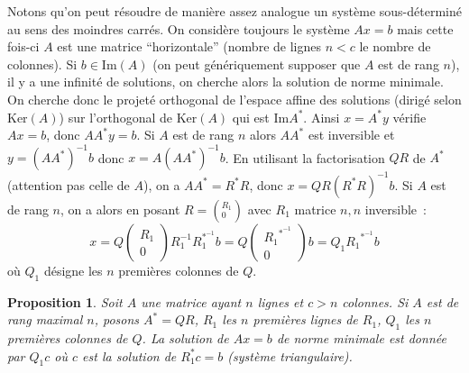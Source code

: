 \documentclass[a4paper,11pt]{article}
\newtheorem{prop}[thm]{Proposition}
\begin{document}
\begin{giacjshere}
Notons qu'on peut r\'esoudre de mani\`ere assez analogue
un syst\`eme sous-d\'etermin\'e au sens des moindres carr\'es.
On consid\`ere toujours le syst\`eme $Ax=b$ mais cette fois-ci
$A$ est une matrice ``horizontale'' (nombre de lignes $n<c$ le nombre
de colonnes). Si $b \in $Im$(A)$ (on peut g\'en\'eriquement supposer
que $A$ est de rang $n$), 
il y a une infinit\'e de solutions, on
cherche alors la solution de norme minimale. On cherche donc le
projet\'e orthogonal de l'espace affine des solutions (dirig\'e selon Ker$(A)$)
sur l'orthogonal de Ker$(A)$ qui est Im$A^*$. Ainsi $x=A^*y$
v\'erifie $Ax=b$, donc $AA^*y=b$. Si $A$ est de rang $n$ alors
$AA^* $ est inversible et $y=(AA^*)^{-1}b$ donc $x=A (AA^*)^{-1}b$.
En utilisant la factorisation $QR$ de $A^*$ (attention pas celle de
$A$), on a $AA^*=R^*R$, donc $x=QR(R^*R)^{-1}b$. Si $A$ est de rang $n$,
on a alors en posant $R=(^{R_1}_{0})$ avec $R_1$ matrice $n,n$ inversible~:
$$x=Q\left(\begin{array}{c}R_1\\0\end{array}\right)R_1^{-1} R_1^{*^{-1}}b=Q\left(\begin{array}{c}
{R_1}^{*^{-1}} \\ 0\end{array}\right)b=Q_1 {R_1}^{*^{-1}} b$$
o\`u $Q_1$ d\'esigne les $n$ premi\`eres colonnes de $Q$.
\begin{prop}
Soit $A$ une matrice ayant $n$ lignes et $c>n$ colonnes.
Si $A$ est de rang maximal $n$, posons $A^*=QR$, $R_1$ les $n$
premi\`eres lignes de $R_1$, $Q_1$ les $n$ premi\`eres colonnes
de $Q$. La solution de $Ax=b$ de norme
minimale est donn\'ee par $Q_1c$ o\`u $c$ est la solution de $R_1^*c=b$
(syst\`eme triangulaire).
\end{prop}


\end{giacjshere}
\end{document}

